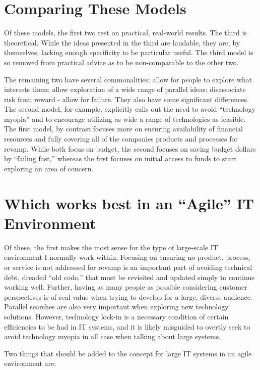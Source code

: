 \documentclass[man]{apa7}
\begin{document}
\section{Comparing These Models}
\label{sec:org436b35c}

Of these models, the first two rest on practical, real-world results. The third is theoretical. While the ideas presented in the third are laudable, they are, by themselves, lacking enough specificity to be particular useful. The third model is so removed from practical advice as to be non-comparable to the other two. 

The remaining two have several commonalities: allow for people to explore what interests them; allow exploration of a wide range of parallel ideas; disassociate risk from reward - allow for failure. They also have some significant differences. The second model, for example, explicitly calls out the need to avoid ``technology myopia'' and to encourage utilizing as wide a range of technologies as feasible. The first model, by contrast focuses more on ensuring availability of financial resources and fully covering all of the companies products and processes for revamp. While both focus on budget, the second focuses on saving budget dollars by ``failing fast,'' whereas the first focuses on initial access to funds to start exploring an area of concern. 

\section{Which works best in an ``Agile'' IT Environment}
\label{sec:org68fe919}

Of these, the first makes the most sense for the type of large-scale IT environment I normally work within. Focusing on ensuring no product, process, or service is not addressed for revamp is an important part of avoiding technical debt, dreaded ``old code,'' that must be revisited and updated simply to continue working well. Further, having as many people as possible considering customer perspectives is of real value when trying to develop for a large, diverse audience.  Parallel searches are also very important when exploring new technology solutions. However, technology lock-in is a necessary condition of certain efficiencies to be had in IT systems, and it is likely misguided to overtly seek to avoid technology myopia in all case when talking about large systems.

Two things that should be added to the concept for large IT systems in an agile environment are:
\end{document}
